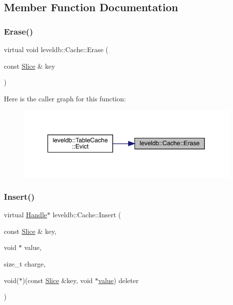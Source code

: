 \subsection{Member Function Documentation}
\mbox{\label{classleveldb_1_1_cache_af833a38763598253338de37aba079db6}} 
\subsubsection{\texorpdfstring{Erase()}{Erase()}}
{\footnotesize\ttfamily virtual void leveldb\+::\+Cache\+::\+Erase (\begin{DoxyParamCaption}\item[{const \mbox{\hyperlink{classleveldb_1_1_slice}{Slice}} \&}]{key }\end{DoxyParamCaption})\hspace{0.3cm}{\ttfamily [pure virtual]}}

Here is the caller graph for this function\+:
\nopagebreak
\begin{figure}[H]
\begin{center}
\leavevmode
\includegraphics[width=336pt]{classleveldb_1_1_cache_af833a38763598253338de37aba079db6_icgraph}
\end{center}
\end{figure}
\mbox{\label{classleveldb_1_1_cache_af0b55b7fa0e64184fa62e0dbe9ba9eae}} 
\subsubsection{\texorpdfstring{Insert()}{Insert()}}
{\footnotesize\ttfamily virtual \mbox{\hyperlink{structleveldb_1_1_cache_1_1_handle}{Handle}}$\ast$ leveldb\+::\+Cache\+::\+Insert (\begin{DoxyParamCaption}\item[{const \mbox{\hyperlink{classleveldb_1_1_slice}{Slice}} \&}]{key,  }\item[{void $\ast$}]{value,  }\item[{size\+\_\+t}]{charge,  }\item[{void($\ast$)(const \mbox{\hyperlink{classleveldb_1_1_slice}{Slice}} \&key, void $\ast$\mbox{\hyperlink{version__set_8cc_a38c8b88c432e666ad10b0c5573e1160a}{value}})}]{deleter }\end{DoxyParamCaption})\hspace{0.3cm}{\ttfamily [pure virtual]}}

